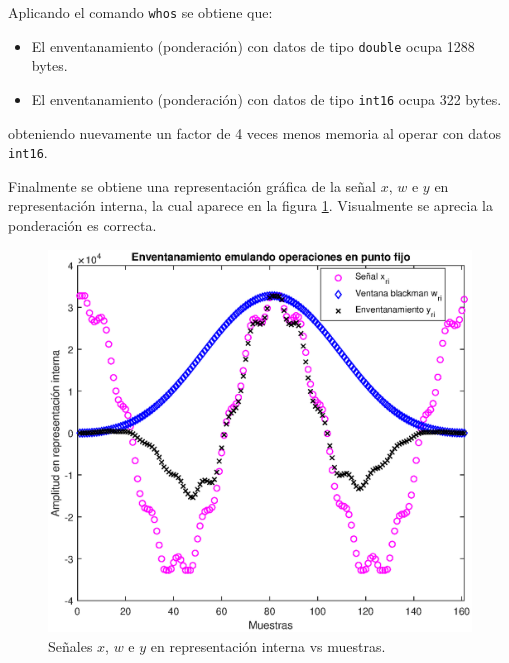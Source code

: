 \begin{enumerate}[a)]
    Aplicando el comando \texttt{whos} se obtiene que:
    \begin{itemize}
        \item El enventanamiento (ponderación) con datos de tipo \texttt{double} ocupa 1288 bytes.
        \item El enventanamiento (ponderación) con datos de tipo \texttt{int16} ocupa 322 bytes.
    \end{itemize}
    
    obteniendo nuevamente un factor de 4 veces menos memoria al operar con datos \texttt{int16}. 
    
    Finalmente se obtiene una representación gráfica de la señal $x$, $w$ e $y$ en representación interna, la cual aparece en la figura \ref{fig:p6_graf}. Visualmente se aprecia la ponderación es correcta.
    
    \begin{figure}[H]
        \centering
        \includegraphics[width = .9\linewidth]{imagenes2/p6_graf.eps}
        \caption{Señales $x$, $w$ e $y$ en representación interna vs muestras.}
        \label{fig:p6_graf}
    \end{figure}
    
\end{enumerate}